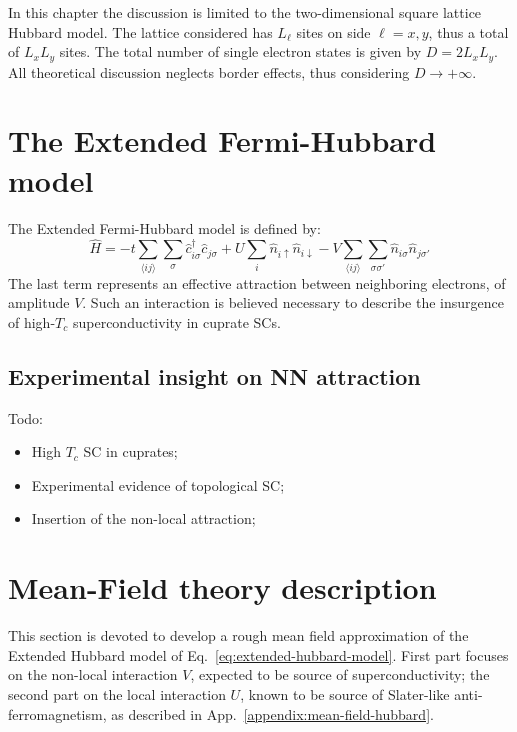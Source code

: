 In this chapter the discussion is limited to the two-dimensional square lattice Hubbard model. The lattice considered has $L_\ell$ sites on side $\ell = x,y$, thus a total of $L_x L_y$ sites. The total number of single electron states is given by $D = 2L_x L_y$. All theoretical discussion neglects border effects, thus considering $D \to +\infty$.

\section{The Extended Fermi-Hubbard model}

The Extended Fermi-Hubbard model is defined by:
\begin{equation}\label{eq:extended-hubbard-model}
	\hat H =
	-t \sum_{\langle ij \rangle} \sum_\sigma \hat c_{i\sigma}^\dagger \hat c_{j\sigma}
	+ U \sum_i \hat n_{i\uparrow} \hat n_{i\downarrow}
	- V \sum_{\langle ij \rangle} \sum_{\sigma \sigma'} \hat n_{i\sigma} \hat n_{j\sigma'}
\end{equation}
The last term represents an effective attraction between neighboring electrons, of amplitude $V$. Such an interaction is believed \cite{cao2025p-wave} necessary to describe the insurgence of high-$T_c$ superconductivity in cuprate SCs. \todo

\subsection{Experimental insight on NN attraction}

{\color{tabred}Todo:
\begin{itemize}
	\item High $T_c$ SC in cuprates;
	\item Experimental evidence of topological SC;
	\item Insertion of the non-local attraction;
\end{itemize}}

\section{Mean-Field theory description}

This section is devoted to develop a rough mean field approximation of the Extended Hubbard model of Eq.~\eqref{eq:extended-hubbard-model}. First part focuses on the non-local interaction $V$, expected to be source of superconductivity; the second part on the local interaction $U$, known to be source of Slater-like anti-ferromagnetism, as described in App.~\ref{appendix:mean-field-hubbard}.

